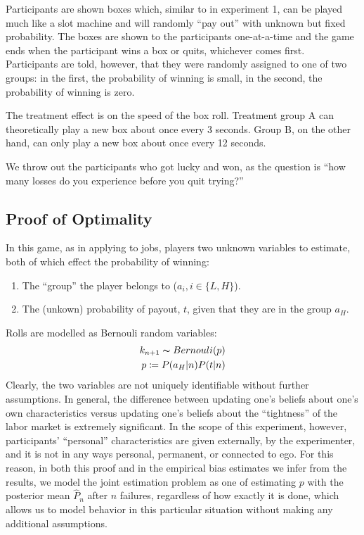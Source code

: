 \documentclass[a4paper,12pt]{article}
\begin{document}
Participants are shown boxes which, similar to in experiment 1, can be played much like a slot machine and will randomly ``pay out'' with unknown but fixed probability. The boxes are shown to the participants one-at-a-time and the game ends when the participant wins a box or quits, whichever comes first. Participants are told, however, that they were randomly assigned to one of two groups: in the first, the probability of winning is small, in the second, the probability of winning is zero.

The treatment effect is on the speed of the box roll. Treatment group A can theoretically play a new box about once every 3 seconds. Group B, on the other hand, can only play a new box about once every 12 seconds.

We throw out the participants who got lucky and won, as the question is ``how many losses do you experience before you quit trying?''

\subsection{ Proof of Optimality }

In this game, as in applying to jobs, players two unknown variables to estimate, both of which effect the probability of winning:

\begin{enumerate}
\item The ``group'' the player belongs to ($a_i, i \in \{L,H\}$).
\item The (unkown) probability of payout, $t$, given that they are in the group $a_H$.
\end{enumerate}
%
Rolls are modelled as Bernouli random variables:
\begin{align*}
k_{n+1} \thicksim Bernouli( p ) \\
p \coloneqq P(a_H | n)P(t | n)
\end{align*}
Clearly, the two variables are not uniquely identifiable without further assumptions. In general, the difference between updating one's beliefs about one's own characteristics versus updating one's beliefs about the ``tightness'' of the labor market is extremely significant. In the scope of this experiment, however, participants' ``personal'' characteristics are given externally, by the experimenter, and it is not in any ways personal, permanent, or connected to ego. For this reason, in both this proof and in the empirical bias estimates we infer from the results, we model the joint estimation problem as one of estimating $p$ with the posterior mean $\hat{P}_n$ after $n$ failures, regardless of how exactly it is done, which allows us to model behavior in this particular situation without making any additional assumptions.
\end{document}
